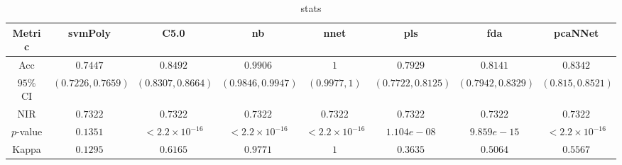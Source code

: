 \begin{table}[!ht]
	\centering
	\begin{tabular}{|c|c|c|c|c|c|c|c|}
		\hline
		Metric & svmPoly & C5.0 & nb & nnet & pls & fda & pcaNNet \\ \hline
		Acc & $0.7447$ & $0.8492$ & $0.9906$ & $1$ & $0.7929$ & $0.8141$ & $0.8342$ \\ \hline
		$95\%$ CI & $(0.7226, 0.7659)$ & $(0.8307, 0.8664)$ & $(0.9846, 0.9947)$ & $(0.9977, 1)$ & $(0.7722, 0.8125)$ & $(0.7942, 0.8329)$ & $(0.815, 0.8521)$ \\ \hline
		NIR & $0.7322$ & $0.7322$ & $0.7322$ & $0.7322$ & $0.7322$ & $0.7322$ & $0.7322$ \\ \hline
		$p$-value & $0.1351$ & $< 2.2 \times {10}^{-16}$ & $< 2.2 \times {10}^{-16}$ & $< 2.2 \times {10}^{-16}$ & $1.104e-08$ & $9.859e-15$ & $< 2.2 \times {10}^{-16}$ \\ \hline
		Kappa & $0.1295$ & $0.6165$ & $0.9771$ & $1$ & $0.3635$ & $0.5064$ & $0.5567$ \\ \hline
	\end{tabular}
	\caption{stats}
	\label{tab:stats}
\end{table}
